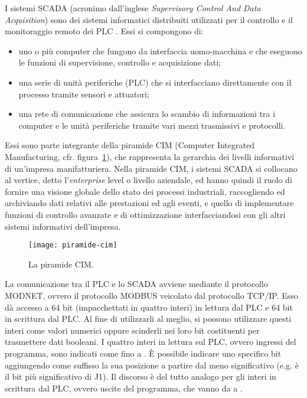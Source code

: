 I sistemi SCADA (acronimo dall'inglese \emph{Supervisory Control And Data Acquisition}) sono dei
sistemi informatici distribuiti utilizzati per il controllo e il monitoraggio remoto dei PLC
\cite{daneels_salter,ferrazza,sielco}. Essi si compongono di:
\begin{itemize}
    \item uno o più computer che fungono da interfaccia uomo-macchina e che eseguono le funzioni di
        supervisione, controllo e acquisizione dati;
    \item una serie di unità periferiche (PLC) che si interfacciano direttamente con il processo
        tramite sensori e attuatori;
    \item una rete di comunicazione che assicura lo scambio di informazioni tra i computer e le
        unità periferiche tramite vari mezzi trasmissivi e protocolli.
\end{itemize}
Essi sono parte integrante della piramide CIM (Computer Integrated Manufacturing, cfr.\@
figura~\ref{fig:piramide-cim}), che rappresenta la gerarchia dei livelli informativi di un'impresa
manifatturiera. Nella piramide CIM, i sistemi SCADA si collocano al vertice, detto
l'\emph{enterprise} level o livello aziendale, ed hanno quindi il ruolo di fornire una visione
globale dello stato dei processi industriali, raccogliendo ed archiviando dati relativi alle
prestazioni ed agli eventi, e quello di implementare funzioni di controllo avanzate e di
ottimizzazione interfacciandosi con gli altri sistemi informativi dell'impresa.

\begin{figure}[htbp]\centering
    \caption{La piramide CIM.}\label{fig:piramide-cim}
    \texttt{[image: piramide-cim]}
\end{figure}

La comunicazione tra il PLC e lo SCADA avviene mediante il protocollo MODNET, ovvero il protocollo
MODBUS veicolato dal protocollo TCP/IP. Esso dà accesso a 64 bit (impacchettati in quattro interi)
in lettura dal PLC e 64 bit in scrittura dal PLC. Al fine di utilizzarli al meglio, si possono
utilizzare questi interi come valori numerici oppure scinderli nei loro bit costituenti per
trasmettere dati booleani. I quattro interi in lettura sul PLC, ovvero ingressi del programma, sono
indicati come  fino a . È possibile indicare uno specifico bit aggiungendo
come suffisso la sua posizione a partire dal meno significativo (e.g.\@ {} è il bit
più significativo di J1). Il discorso è del tutto analogo per gli interi in scrittura dal PLC,
ovvero uscite del programma, che vanno da  a .

